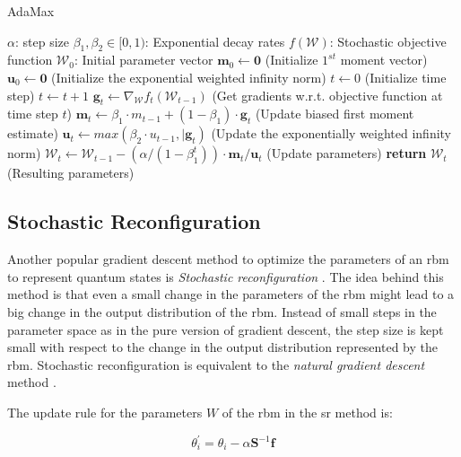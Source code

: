 \begin{algorithm}
    \caption{AdaMax}
    \begin{algorithmic}[1]
        \Require $\alpha$: step size
        \Require $\beta_1, \beta_2 \in [0,1)$: Exponential decay rates
        \Require $f(\mathcal{W})$: Stochastic objective function
        \Require $\mathcal{W}_0$: Initial parameter vector
        \State $\bm{m}_0 \gets \bm{0}$ (Initialize $1^{st}$ moment vector)
        \State $\bm{u}_0 \gets \bm{0}$ (Initialize the exponential weighted infinity norm)
        \State $t \gets 0$ (Initialize time step)
            \State $t\gets t+1$
            \State $\bm{g}_t \gets \nabla_{\mathcal{W}}f_t(\mathcal{W}_{t-1})$ (Get gradients w.r.t. objective function at time step $t$)
            \State $\bm{m}_t \gets \beta_1 \cdot m_{t-1} + (1-\beta_1) \cdot \bm{g}_t$ (Update biased first moment estimate)
            \State $\bm{u}_t \gets max(\beta_2 \cdot u_{t-1}, \vert{\bm{g}_t})$ (Update the exponentially weighted infinity norm)
            \State $\mathcal{W}_t \gets \mathcal{W}_{t-1} - (\alpha/ (1-\beta_1^t)) \cdot \bm{m}_t/\bm{u}_t$ (Update parameters)
        \EndWhile
        \State \textbf{return} $\mathcal{W}_t$ (Resulting parameters)
    \end{algorithmic}
    \label{alg:adamax}
\end{algorithm}

\subsection{Stochastic Reconfiguration}
Another popular gradient descent method to optimize the parameters of an \gls{rbm} to represent quantum states is 
\textit{Stochastic reconfiguration} \cite{sorella1998green}. The idea behind this method is that even a small change in the 
parameters of the \gls{rbm} might lead to a big change in the output distribution of the \gls{rbm}. Instead of small steps
 in the parameter space as in the pure version of gradient descent, the step size is kept small 
with respect to the change in the output distribution represented by the \gls{rbm}. Stochastic reconfiguration is equivalent 
to the \textit{natural gradient descent} method \cite{amari1998natural}.

The update rule for the parameters $W$ of the \gls{rbm} in the \gls{sr} method is:

\begin{equation}
    \theta_i^{\prime} = \theta_i - \alpha \bm{S}^{-1} \bm{f}
\end{equation}

